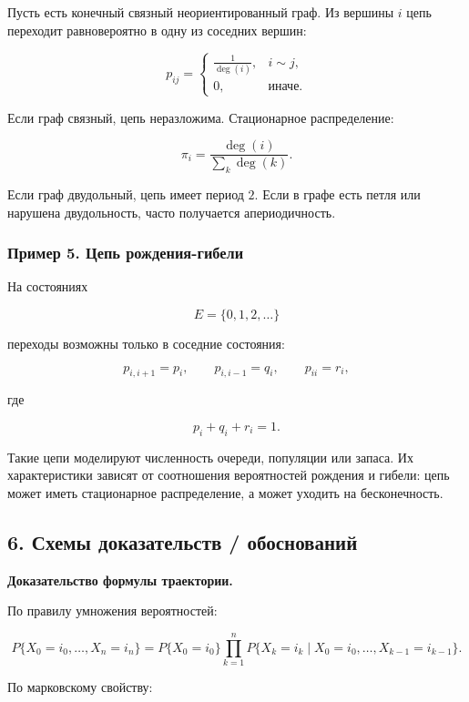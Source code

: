 \documentclass[
  11pt,
  a4paper,
]{article}
\begin{document}
Пусть есть конечный связный неориентированный граф. Из вершины \(i\)
цепь переходит равновероятно в одну из соседних вершин:

\[
p_{ij}=
\begin{cases}
\frac{1}{\deg(i)}, & i\sim j,\\
0, & \text{иначе}.
\end{cases}
\]

Если граф связный, цепь неразложима. Стационарное распределение:

\[
\pi_i=\frac{\deg(i)}{\sum_k\deg(k)}.
\]

Если граф двудольный, цепь имеет период \(2\). Если в графе есть петля
или нарушена двудольность, часто получается апериодичность.

\subsubsection{Пример 5. Цепь
рождения-гибели}\label{ux43fux440ux438ux43cux435ux440-5.-ux446ux435ux43fux44c-ux440ux43eux436ux434ux435ux43dux438ux44f-ux433ux438ux431ux435ux43bux438}

На состояниях

\[
E=\{0,1,2,\ldots\}
\]

переходы возможны только в соседние состояния:

\[
p_{i,i+1}=p_i,
\qquad
p_{i,i-1}=q_i,
\qquad
p_{ii}=r_i,
\]

где

\[
p_i+q_i+r_i=1.
\]

Такие цепи моделируют численность очереди, популяции или запаса. Их
характеристики зависят от соотношения вероятностей рождения и гибели:
цепь может иметь стационарное распределение, а может уходить на
бесконечность.

\subsection{6. Схемы доказательств /
обоснований}\label{ux441ux445ux435ux43cux44b-ux434ux43eux43aux430ux437ux430ux442ux435ux43bux44cux441ux442ux432-ux43eux431ux43eux441ux43dux43eux432ux430ux43dux438ux439}

\textbf{Доказательство формулы траектории.}

По правилу умножения вероятностей:

\[
P\{X_0=i_0,\ldots,X_n=i_n\}
=
P\{X_0=i_0\}
\prod_{k=1}^n
P\{X_k=i_k\mid X_0=i_0,\ldots,X_{k-1}=i_{k-1}\}.
\]

По марковскому свойству:
\end{document}
